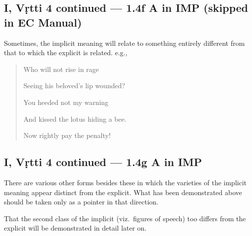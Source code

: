 \documentclass[12pt]{book}
\begin{document}
\subsection{I, Vṛtti 4 continued --- 1.4f A in IMP (skipped in EC Manual)}

Sometimes, the implicit meaning will relate to something
entirely different from that to which the explicit is related. e.g.,

\begin{quotation}
\begin{em}
Who will not rise in rage

Seeing his beloved's lip wounded?

You heeded not my warning

And kissed the lotus hiding a bee.

Now rightly pay the penalty!
\end{em}
\end{quotation}


\subsection{I, Vṛtti 4 continued --- 1.4g A in IMP}

There are various other forms besides these in which the
varieties of the implicit meaning appear distinct from the explicit.
What has been demonstrated above should be taken only as a
pointer in that direction.

That the second class of the implicit (viz.\ figures of speech)
too differs from the explicit will be demonstrated in detail
later on.
\end{document}
